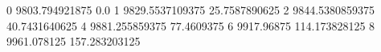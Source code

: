 0 9803.794921875 0.0
1 9829.5537109375 25.7587890625
2 9844.5380859375 40.7431640625
4 9881.255859375 77.4609375
6 9917.96875 114.173828125
8 9961.078125 157.283203125
